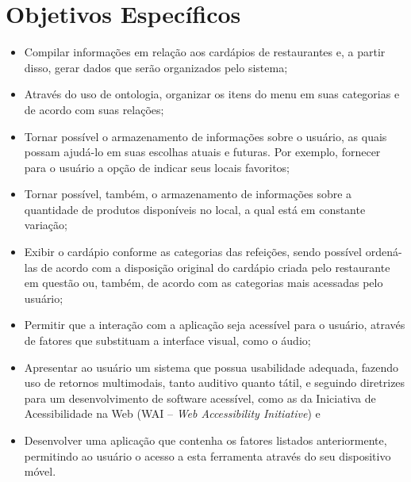 \section{Objetivos Específicos}
\begin{itemize}
    \item Compilar informações em relação aos cardápios de restaurantes e, a partir disso, gerar dados que serão organizados pelo sistema;
    \item Através do uso de ontologia, organizar os itens do menu em suas categorias e de acordo com suas relações;
    \item Tornar possível o armazenamento de informações sobre o usuário, as quais possam ajudá-lo em suas escolhas atuais e futuras. Por exemplo, fornecer para o usuário a opção de indicar seus locais favoritos;
    \item Tornar possível, também, o armazenamento de informações sobre a quantidade de produtos disponíveis no local, a qual está em constante variação;
    \item Exibir o cardápio conforme as categorias das refeições, sendo possível ordená-las de acordo com a disposição original do cardápio criada pelo restaurante em questão ou, também, de acordo com as categorias mais acessadas pelo usuário;
    \item Permitir que a interação com a aplicação seja acessível para o usuário, através de fatores que substituam a interface visual, como o áudio;
    \item Apresentar ao usuário um sistema que possua usabilidade adequada, fazendo uso de retornos multimodais, tanto auditivo quanto tátil, e seguindo diretrizes para um desenvolvimento de software acessível, como as da Iniciativa de Acessibilidade na Web (WAI -- \emph{Web Accessibility Initiative}) e
    \item Desenvolver uma aplicação que contenha os fatores listados anteriormente, permitindo ao usuário o acesso a esta ferramenta através do seu dispositivo móvel.
\end{itemize}